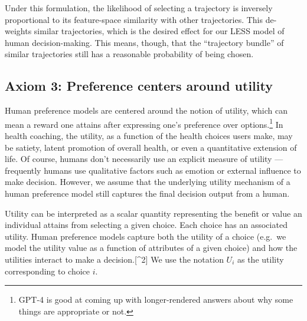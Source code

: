 \documentclass[
  letterpaper,
  numbers=noenddot,
  DIV=11]{scrreprt}
\theoremstyle{definition}
\theoremstyle{plain}
\theoremstyle{plain}
\theoremstyle{remark}
\begin{document}
Under this formulation, the likelihood of selecting a trajectory is
inversely proportional to its feature-space similarity with other
trajectories. This de-weights similar trajectories, which is the desired
effect for our LESS model of human decision-making. This means, though,
that the ``trajectory bundle'' of similar trajectories still has a
reasonable probability of being chosen.

\subsection*{Axiom 3: Preference centers around
utility}\label{axiom-3-preference-centers-around-utility}

Human preference models are centered around the notion of utility, which
can mean a reward one attains after expressing one's preference over
options.\footnote{GPT-4 is good at coming up with longer-rendered
  answers about why some things are appropriate or not.} In health
coaching, the utility, as a function of the health choices users make,
may be satiety, latent promotion of overall health, or even a
quantitative extension of life. Of course, humans don't necessarily use
an explicit measure of utility --- frequently humans use qualitative
factors such as emotion or external influence to make decision. However,
we assume that the underlying utility mechanism of a human preference
model still captures the final decision output from a human.

Utility can be interpreted as a scalar quantity representing the benefit
or value an individual attains from selecting a given choice. Each
choice has an associated utility. Human preference models capture both
the utility of a choice (e.g.~we model the utility value as a function
of attributes of a given choice) and how the utilities interact to make
a decision.{[}\^{}2{]} We use the notation \(U_i\) as the utility
corresponding to choice \(i\).
\end{document}
